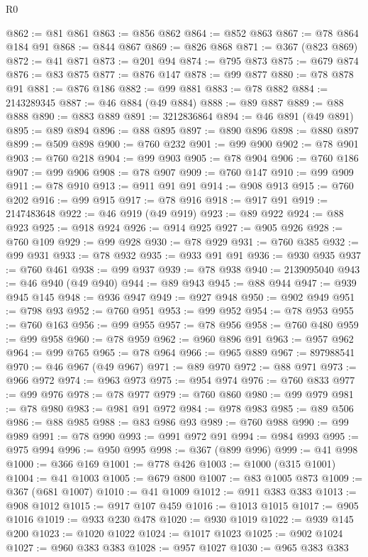 \begin{lexlean}{R0}
\begin{coremodule}
@862 := @81 @861
@863 := @856 @862
@864 := @852 @863
@867 := @78 @864 @184 @91
@868 := @844 @867
@869 := @826 @868
@871 := @367 (@823 @869)
@872 := @41 @871
@873 := @201 @94
@874 := @795 @873
@875 := @679 @874
@876 := @83 @875
@877 := @876 @147
@878 := @99 @877
@880 := @78 @878 @91
@881 := @876 @186
@882 := @99 @881
@883 := @78 @882
@884 := 2143289345
@887 := @46 @884 (@49 @884)
@888 := @89 @887
@889 := @88 @888
@890 := @883 @889
@891 := 3212836864
@894 := @46 @891 (@49 @891)
@895 := @89 @894
@896 := @88 @895
@897 := @890 @896
@898 := @880 @897
@899 := @509 @898
@900 := @760 @232
@901 := @99 @900
@902 := @78 @901
@903 := @760 @218
@904 := @99 @903
@905 := @78 @904
@906 := @760 @186
@907 := @99 @906
@908 := @78 @907
@909 := @760 @147
@910 := @99 @909
@911 := @78 @910
@913 := @911 @91 @91
@914 := @908 @913
@915 := @760 @202
@916 := @99 @915
@917 := @78 @916
@918 := @917 @91
@919 := 2147483648
@922 := @46 @919 (@49 @919)
@923 := @89 @922
@924 := @88 @923
@925 := @918 @924
@926 := @914 @925
@927 := @905 @926
@928 := @760 @109
@929 := @99 @928
@930 := @78 @929
@931 := @760 @385
@932 := @99 @931
@933 := @78 @932
@935 := @933 @91 @91
@936 := @930 @935
@937 := @760 @461
@938 := @99 @937
@939 := @78 @938
@940 := 2139095040
@943 := @46 @940 (@49 @940)
@944 := @89 @943
@945 := @88 @944
@947 := @939 @945 @145
@948 := @936 @947
@949 := @927 @948
@950 := @902 @949
@951 := @798 @93
@952 := @760 @951
@953 := @99 @952
@954 := @78 @953
@955 := @760 @163
@956 := @99 @955
@957 := @78 @956
@958 := @760 @480
@959 := @99 @958
@960 := @78 @959
@962 := @960 @896 @91
@963 := @957 @962
@964 := @99 @765
@965 := @78 @964
@966 := @965 @889
@967 := 897988541
@970 := @46 @967 (@49 @967)
@971 := @89 @970
@972 := @88 @971
@973 := @966 @972
@974 := @963 @973
@975 := @954 @974
@976 := @760 @833
@977 := @99 @976
@978 := @78 @977
@979 := @760 @860
@980 := @99 @979
@981 := @78 @980
@983 := @981 @91 @972
@984 := @978 @983
@985 := @89 @506
@986 := @88 @985
@988 := @83 @986 @93
@989 := @760 @988
@990 := @99 @989
@991 := @78 @990
@993 := @991 @972 @91
@994 := @984 @993
@995 := @975 @994
@996 := @950 @995
@998 := @367 (@899 @996)
@999 := @41 @998
@1000 := @366 @169
@1001 := @778 @426
@1003 := @1000 (@315 @1001)
@1004 := @41 @1003
@1005 := @679 @800
@1007 := @83 @1005 @873
@1009 := @367 (@681 @1007)
@1010 := @41 @1009
@1012 := @911 @383 @383
@1013 := @908 @1012
@1015 := @917 @107 @459
@1016 := @1013 @1015
@1017 := @905 @1016
@1019 := @933 @230 @478
@1020 := @930 @1019
@1022 := @939 @145 @200
@1023 := @1020 @1022
@1024 := @1017 @1023
@1025 := @902 @1024
@1027 := @960 @383 @383
@1028 := @957 @1027
@1030 := @965 @383 @383

\end{coremodule}
\end{lexlean}
